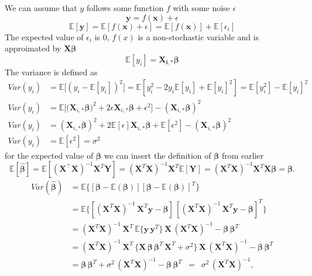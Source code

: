\documentclass[twoside,11pt]{report}
\begin{document}
We can assume that $y$ follows some function $f$ with some noise $\epsilon$
$$
\mathbf{y} = f(\mathbf{x}) + \epsilon
$$
$$
\mathbb{E}[\mathbf{y}] = \mathbb{E}[f(\mathbf{x} )+ \epsilon] = \mathbb{E}[f(\mathbf{x})] + \mathbb{E}[\epsilon_i]
$$
The expected value of $\epsilon_i$ is $0$, $f(x)$ is a non-stochastic variable and is approimated by $\boldsymbol{X}\boldsymbol{\beta}$
$$
\mathbb{E}[y_i] = \boldsymbol{X_{i,*}}\boldsymbol{\beta}
$$
The variance is defined as
\begin{align*}
Var(y_i) &= \mathbb{E}\big[(y_i - \mathbb{E}[y_i])^2\big] = \mathbb{E}\left[y_i^2 - 2y_i\mathbb{E}[y_i] + \mathbb{E}[y_i]^2\right] = \mathbb{E}[y_i^2] - \mathbb{E}[y_i]^2\\
Var(y_i) &= \mathbb{E}\big[\big(\boldsymbol{X}_{i,*}\boldsymbol{\beta}\big)^2 + 2\epsilon \boldsymbol{X}_{i,*}\boldsymbol{\beta} + \epsilon^2 \big] - (\boldsymbol{X}_{i,*}\boldsymbol{\beta})^2\\
Var(y_i) &= (\boldsymbol{X}_{i,*}\boldsymbol{\beta})^2 + 2\mathbb{E}[\epsilon]\boldsymbol{X}_{i,*}\boldsymbol{\beta} + \mathbb{E}[\epsilon^2] - (\boldsymbol{X}_{i,*}\boldsymbol{\beta})^2\\
Var(y_i) &= \mathbb{E}[\epsilon^2] = \sigma^2
\end{align*}
for the expected value of $\boldsymbol{\beta}$ we can insert the definition of $\boldsymbol{\beta}$ from earlier
$$
\mathbb{E}[\boldsymbol{\hat{\beta}}] = \mathbb{E}[ (\mathbf{X}^{\top} \mathbf{X})^{-1}\mathbf{X}^{T} \mathbf{Y}]=(\mathbf{X}^{T} \mathbf{X})^{-1}\mathbf{X}^{T} \mathbb{E}[ \mathbf{Y}]=(\mathbf{X}^{T} \mathbf{X})^{-1} \mathbf{X}^{T}\mathbf{X}\boldsymbol{\beta}=\boldsymbol{\beta}.
$$
\begin{align*}
Var(\boldsymbol{\hat{\beta}}) & = \mathbb{E} \{ [\boldsymbol{\beta} - \mathbb{E}(\boldsymbol{\beta})] [\boldsymbol{\beta} - \mathbb{E}(\boldsymbol{\beta})]^{T} \}
\\
& = \mathbb{E} \{ [(\mathbf{X}^{T} \mathbf{X})^{-1} \, \mathbf{X}^{T} \mathbf{y} - \boldsymbol{\beta}] \, [(\mathbf{X}^{T} \mathbf{X})^{-1} \, \mathbf{X}^{T} \mathbf{y} - \boldsymbol{\beta}]^{T} \}
\\
& = (\mathbf{X}^{T} \mathbf{X})^{-1} \, \mathbf{X}^{T} \, \mathbb{E} \{ \mathbf{y} \, \mathbf{y}^{T} \} \, \mathbf{X} \, (\mathbf{X}^{T} \mathbf{X})^{-1} - \boldsymbol{\beta} \, \boldsymbol{\beta}^{T}
\\
& = (\mathbf{X}^{T} \mathbf{X})^{-1} \, \mathbf{X}^{T} \, \{ \mathbf{X} \, \boldsymbol{\beta} \, \boldsymbol{\beta}^{T} \,  \mathbf{X}^{T} + \sigma^2 \} \, \mathbf{X} \, (\mathbf{X}^{T} \mathbf{X})^{-1} - \boldsymbol{\beta} \, \boldsymbol{\beta}^{T}
\\
& = \boldsymbol{\beta} \, \boldsymbol{\beta}^{T}  + \sigma^2 \, (\mathbf{X}^{T} \mathbf{X})^{-1} - \boldsymbol{\beta} \, \boldsymbol{\beta}^{T}
\, \, \, = \, \, \, \sigma^2 \, (\mathbf{X}^{T} \mathbf{X})^{-1},
\end{align*}
\end{document}
